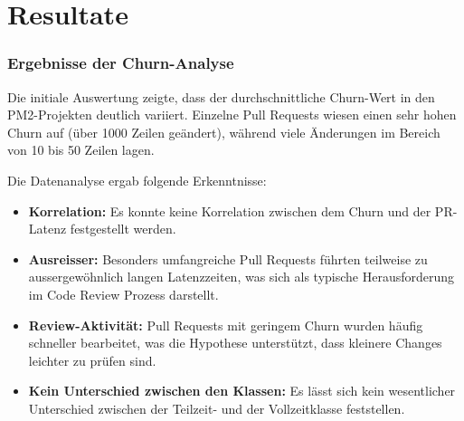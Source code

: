 


\chapter{Resultate} %

\label{Chapter4} %


\subsection{Ergebnisse der Churn-Analyse}

Die initiale Auswertung zeigte, dass der durchschnittliche Churn-Wert in den PM2-Projekten deutlich variiert. Einzelne Pull Requests wiesen einen sehr hohen Churn auf (über 1000 Zeilen geändert), während viele Änderungen im Bereich von 10 bis 50 Zeilen lagen. 

Die Datenanalyse ergab folgende Erkenntnisse:

\begin{itemize}
    \item \textbf{Korrelation:} Es konnte keine Korrelation zwischen dem Churn und der PR-Latenz festgestellt werden.
    \item \textbf{Ausreisser:} Besonders umfangreiche Pull Requests führten teilweise zu aussergewöhnlich langen Latenzzeiten, was sich als typische Herausforderung im Code Review Prozess darstellt.
    \item \textbf{Review-Aktivität:} Pull Requests mit geringem Churn wurden häufig schneller bearbeitet, was die Hypothese unterstützt, dass kleinere Changes leichter zu prüfen sind.
    \item \textbf{Kein Unterschied zwischen den Klassen:} Es lässt sich kein wesentlicher Unterschied zwischen der Teilzeit- und der Vollzeitklasse feststellen.    
\end{itemize}

